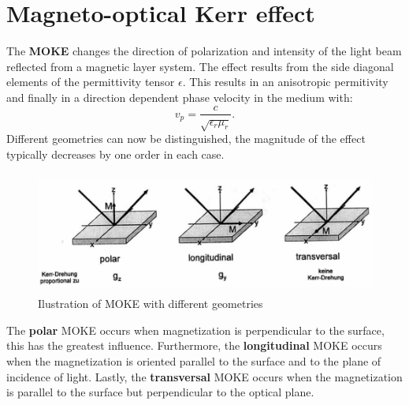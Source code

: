 \section{Magneto-optical Kerr effect}

The \textbf{MOKE} changes the direction of polarization and intensity of the light beam reflected from a magnetic layer system. The effect results from the side diagonal elements of the permittivity tensor $\epsilon$. This results in an anisotropic permitivity and finally in a direction dependent phase velocity in the medium with:
\begin{equation}
    v_p = \frac{c}{\sqrt{\epsilon_r\mu_r}}.
\end{equation}
Different geometries can now be distinguished, the magnitude of the effect typically decreases by one order in each case.  \begin{figure}
    \centering
    \includegraphics[height=4.0cm]{./fig/kerr-pol.png}
    \caption{Ilustration of MOKE with different geometries}
    \label{fig:kerr1}
\end{figure}
The \textbf{polar} MOKE occurs when magnetization is perpendicular to the surface, this has the greatest influence. Furthermore, the \textbf{longitudinal} MOKE occurs when the magnetization is oriented parallel to the surface and to the plane of incidence of light. Lastly, the \textbf{transversal} MOKE occurs when the magnetization is parallel to the surface but perpendicular to the optical plane. 


